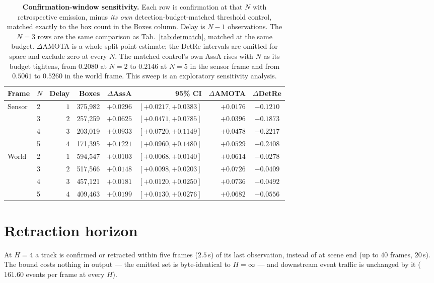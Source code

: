 \begin{table}[t]
\centering\footnotesize
\setlength{\tabcolsep}{5pt}
\begin{tabular}{llrrcrrc}
\toprule
Frame & $N$ & Delay & Boxes & $\Delta$AssA & 95\% CI & $\Delta$AMOTA & $\Delta$DetRe \\
\midrule
\multirow{4}{*}{Sensor}
 & 2 & $1$ & 375{,}982 & ${+}0.0296$ & $[{{+}0.0217},{{+}0.0383}]$ & ${+}0.0176$ & ${-}0.1210$ \\
 & 3 & $2$ & 257{,}259 & ${+}0.0625$ & $[{{+}0.0471},{{+}0.0785}]$ & ${+}0.0396$ & ${-}0.1873$ \\
 & 4 & $3$ & 203{,}019 & ${+}0.0933$ & $[{{+}0.0720},{{+}0.1149}]$ & ${+}0.0478$ & ${-}0.2217$ \\
 & 5 & $4$ & 171{,}395 & ${+}0.1221$ & $[{{+}0.0960},{{+}0.1480}]$ & ${+}0.0529$ & ${-}0.2408$ \\
\midrule
\multirow{4}{*}{World}
 & 2 & $1$ & 594{,}547 & ${+}0.0103$ & $[{{+}0.0068},{{+}0.0140}]$ & ${+}0.0614$ & ${-}0.0278$ \\
 & 3 & $2$ & 517{,}566 & ${+}0.0148$ & $[{{+}0.0098},{{+}0.0203}]$ & ${+}0.0726$ & ${-}0.0409$ \\
 & 4 & $3$ & 457{,}121 & ${+}0.0181$ & $[{{+}0.0120},{{+}0.0250}]$ & ${+}0.0736$ & ${-}0.0492$ \\
 & 5 & $4$ & 409{,}463 & ${+}0.0199$ & $[{{+}0.0130},{{+}0.0276}]$ & ${+}0.0682$ & ${-}0.0556$ \\
\bottomrule
\end{tabular}
\caption{\textbf{Confirmation-window sensitivity.} Each row is confirmation at
that $N$ with retrospective emission, minus \emph{its own}
detection-budget-matched threshold control, matched exactly to the box count
in the Boxes column. Delay is $N{-}1$ observations. The
$N{=}3$ rows are the same comparison as Tab.~\ref{tab:detmatch}, matched at the
same budget. $\Delta$AMOTA is a whole-split point estimate; the
DetRe intervals are omitted for space and exclude zero at every $N$. The matched control's own AssA rises with $N$ as its budget tightens, from
$0.2080$ at $N{=}2$ to $0.2146$ at $N{=}5$ in the sensor frame and from
$0.5061$ to $0.5260$ in the world frame. This sweep is an exploratory
sensitivity analysis.}
\label{tab:nsweep}
\end{table}


\section{Retraction horizon}
\label{supp:horizon}
At $H{=}4$ a track is confirmed or retracted within five frames ($2.5$\,s) of
its last observation, instead of at scene end (up to $40$ frames, $20$\,s).
The bound costs nothing in output --- the emitted set is byte-identical to
$H{=}\infty$ --- and downstream event traffic is unchanged by it ($161.60$
events per frame at every $H$).

